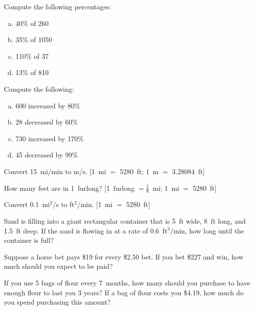 \documentclass[11pt,letterpaper]{article}
\begin{document}
\newpage



 Compute the following percentages:
	\begin{enumerate}[(a)]
	\item 40\% of 260
	\item 35\% of 1050
	\item 110\% of 37
	\item 13\% of 810
	\end{enumerate}



\newpage



 Compute the following:
	\begin{enumerate}[(a)]
	\item 600 increased by 80\%
	\item 28 decreased by 60\%
	\item 730 increased by 170\%
	\item 45 decreased by 99\%
	\end{enumerate}



\newpage



 Convert 15~mi/min to m/s. [1~mi $=$ 5280~ft; 1~m $=$ 3.28084~ft]



\newpage



 How many feet are in 1~furlong? [1~furlong $= \frac{1}{8}$~mi; 1~mi $=$ 5280~ft]



\newpage



 Convert 0.1~mi$^2$/s to ft$^2$/min. [1~mi $=$ 5280~ft]



\newpage



 Sand is filling into a giant rectangular container that is 5~ft wide, 8~ft long, and 1.5~ft deep. If the sand is flowing in at a rate of 0.6~ft$^3$/min, how long until the container is full? 



\newpage



 Suppose a horse bet pays \$19 for every \$2.50 bet. If you bet \$227 and win, how much should you expect to be paid?



\newpage



 If you use 5 bags of flour every 7~months, how many should you purchase to have enough flour to last you 3 years? If a bag of flour costs you \$4.19, how much do you spend purchasing this amount?
\end{document}
